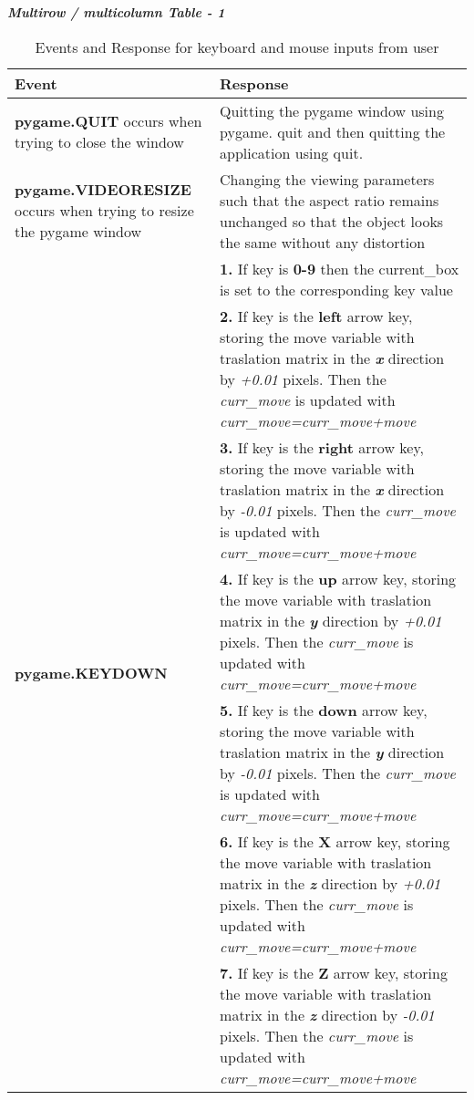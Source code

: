 \documentclass{article}
\begin{document}
	{\Large \textbf{\textit{Multirow / multicolumn Table - 1}}}
	\begin{table}[H]
		\centering
		\caption{Events and Response for keyboard and mouse inputs from user}
		\label{tab:events}
		\begin{tabular}{p{5.5cm} p{8.5cm}}
			\toprule                        %
			
			\textbf{Event} &     
			\textbf{Response}   \\ \hline
			
			\textbf{pygame.QUIT} occurs when trying to close the window &       
			Quitting the pygame window using pygame. quit and then quitting the application using quit. \\ \hline   
			
			\textbf{pygame.VIDEORESIZE} occurs when trying to resize the pygame window & 
			Changing the viewing parameters such that the aspect ratio remains unchanged so that the object looks the same without any distortion \\ \hline   
			
			\multirow{7}{*}{\textbf{pygame.KEYDOWN}} &
			\textbf{1.} If key is \textbf{0-9} then the current\_box is set to the corresponding key value \\ \cline{2-2} &
			\textbf{2.} If key is the \textbf{left} arrow key, storing the move variable with traslation matrix in the \textbf{\textit{x}} direction by \textit{+0.01} pixels. Then the \textit{curr\_move} is updated with \textit{curr\_move=curr\_move+move} \\ \cline{2-2} &
			\textbf{3.} If key is the \textbf{right} arrow key, storing the move variable with traslation matrix in the \textbf{\textit{x}} direction by \textit{-0.01} pixels. Then the \textit{curr\_move} is updated with \textit{curr\_move=curr\_move+move} \\ \cline{2-2} &
			\textbf{4.} If key is the \textbf{up} arrow key, storing the move variable with traslation matrix in the \textbf{\textit{y}} direction by \textit{+0.01} pixels. Then the \textit{curr\_move} is updated with \textit{curr\_move=curr\_move+move}  \\ \cline{2-2} &
			\textbf{5.} If key is the \textbf{down} arrow key, storing the move variable with traslation matrix in the \textbf{\textit{y}} direction by \textit{-0.01} pixels. Then the \textit{curr\_move} is updated with \textit{curr\_move=curr\_move+move}  \\ \cline{2-2} &
			\textbf{6.} If key is the \textbf{X} arrow key, storing the move variable with traslation matrix in the \textbf{\textit{z}} direction by \textit{+0.01} pixels. Then the \textit{curr\_move} is updated with \textit{curr\_move=curr\_move+move}  \\ \cline{2-2} &
			\textbf{7.} If key is the \textbf{Z} arrow key, storing the move variable with traslation matrix in the \textbf{\textit{z}} direction by \textit{-0.01} pixels. Then the \textit{curr\_move} is updated with \textit{curr\_move=curr\_move+move}  \\	
			\hline
			
		\end{tabular}
	\end{table}	
\end{document}
